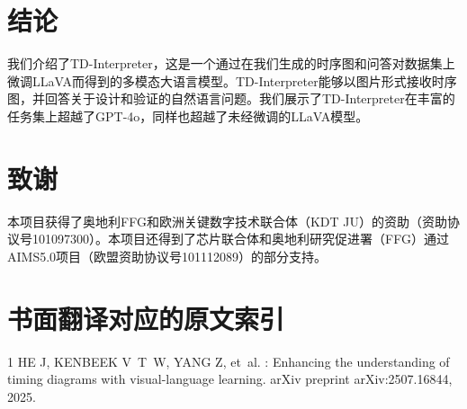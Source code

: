 \section{结论}

我们介绍了TD-Interpreter，这是一个通过在我们生成的时序图和问答对数据集上微调LLaVA而得到的多模态大语言模型。TD-Interpreter能够以图片形式接收时序图，并回答关于设计和验证的自然语言问题。我们展示了TD-Interpreter在丰富的任务集上超越了GPT-4o，同样也超越了未经微调的LLaVA模型。

\section*{致谢}

本项目获得了奥地利FFG和欧洲关键数字技术联合体（KDT JU）的资助（资助协议号101097300）。本项目还得到了芯片联合体和奥地利研究促进署（FFG）通过AIMS5.0项目（欧盟资助协议号101112089）的部分支持。


\newpage
\section*{书面翻译对应的原文索引}

\begin{thebibliography}{1}
HE J, KENBEEK V~T~W, YANG Z, et~al.
: Enhancing the understanding of timing diagrams with
  visual-language learning\allowbreak[J].
\newblock arXiv preprint arXiv:2507.16844, 2025.
\end{thebibliography}
